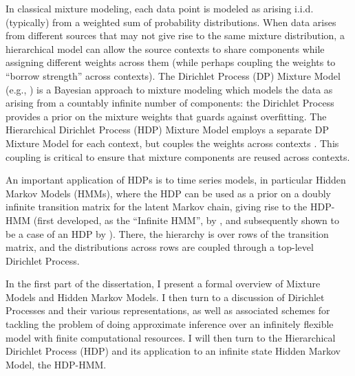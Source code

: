 



In classical mixture modeling, each data point is modeled as arising
i.i.d. (typically) from a weighted sum of probability distributions.
When data arises from different sources
that may not give rise to the same mixture distribution, a
hierarchical model can allow the source contexts to share components while
assigning different weights across them (while perhaps coupling the
weights to ``borrow strength'' across contexts).  The Dirichlet
Process (DP) Mixture Model (e.g., \citet{rasmussen2000infinite}) is a Bayesian
approach to mixture modeling which models the data as arising from a countably
infinite number of components: the Dirichlet Process provides a prior
on the mixture weights that guards against overfitting.  The Hierarchical 
Dirichlet Process (HDP) Mixture Model \citep{teh2006hierarchical} employs
a separate DP Mixture Model for each context, but
couples the weights across contexts%
.  This coupling is critical to ensure
that mixture components are reused across contexts.

An important application of HDPs is to time series
models, in particular Hidden Markov Models (HMMs), where the HDP can be used
as a prior on a doubly infinite transition matrix for the latent Markov
chain, giving rise to the HDP-HMM (first developed, as the ``Infinite
HMM'', by \cite{beal2001infinite}, 
and subsequently shown to be a case of an HDP by \citet{teh2006hierarchical}).  
There, the hierarchy is over rows of the transition matrix,
and the distributions across rows are coupled through a top-level
Dirichlet Process. 

In the first part of the dissertation, I present a formal overview of
Mixture Models and Hidden Markov Models.  I then turn to a discussion
of Dirichlet Processes and their various representations, as well as
associated schemes for tackling the problem of doing approximate inference over an
infinitely flexible model with finite computational resources.  I will
then turn to the Hierarchical Dirichlet Process (HDP) and its application to
an infinite state Hidden Markov Model, the HDP-HMM.

